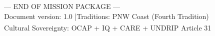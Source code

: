 \documentclass[11pt,letterpaper]{article}
\begin{document}
\vfill
\begin{center}
{\small\sffamily\textcolor{subtlegray}{--- END OF MISSION PACKAGE ---}}\\[0.3em]
{\small\sffamily\textcolor{subtlegray}{Document version: 1.0 \quad|\quad Traditions: PNW Coast (Fourth Tradition)}}\\[0.3em]
{\small\sffamily\textcolor{subtlegray}{Cultural Sovereignty: OCAP\textsuperscript{\textregistered} + IQ + CARE + UNDRIP Article 31}}
\end{center}
\end{document}
